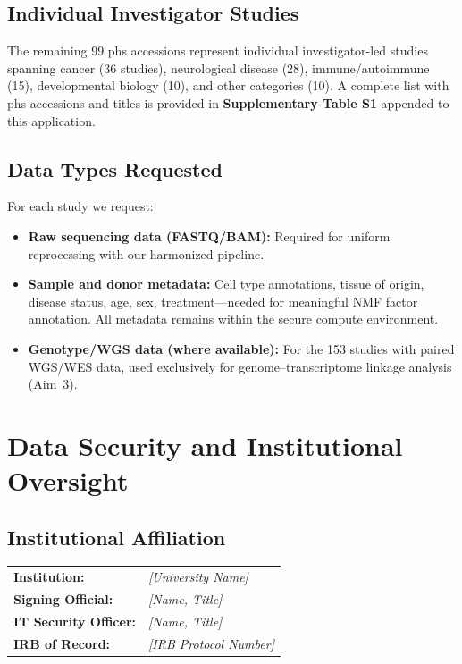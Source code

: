 \documentclass[11pt,letterpaper]{article}
\begin{document}
\subsection{Individual Investigator Studies}

The remaining 99 phs accessions represent individual investigator-led
studies spanning cancer (36 studies), neurological disease (28),
immune/autoimmune (15), developmental biology (10), and other categories
(10). A complete list with phs accessions and titles is provided in
\textbf{Supplementary Table S1} appended to this application.

\subsection{Data Types Requested}

For each study we request:
\begin{itemize}[nosep]
    \item \textbf{Raw sequencing data (FASTQ/BAM):} Required for
          uniform reprocessing with our harmonized pipeline.
    \item \textbf{Sample and donor metadata:} Cell type annotations,
          tissue of origin, disease status, age, sex, treatment---needed
          for meaningful NMF factor annotation. All metadata remains
          within the secure compute environment.
    \item \textbf{Genotype/WGS data (where available):} For the 153
          studies with paired WGS/WES data, used exclusively for
          genome--transcriptome linkage analysis (Aim~3).
\end{itemize}

\section{Data Security and Institutional Oversight}

\subsection{Institutional Affiliation}

\begin{tabular}{@{} l l @{}}
\textbf{Institution:} & \textit{[University Name]} \\
\textbf{Signing Official:} & \textit{[Name, Title]} \\
\textbf{IT Security Officer:} & \textit{[Name, Title]} \\
\textbf{IRB of Record:} & \textit{[IRB Protocol Number]} \\
\end{tabular}
\end{document}
